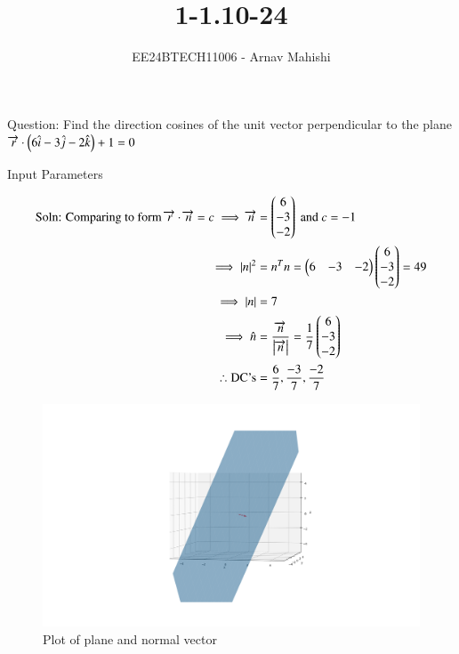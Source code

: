 \documentclass[journal]{IEEEtran}
\begin{document}

\vspace{3cm}

\title{1-1.10-24}
\author{EE24BTECH11006 - Arnav Mahishi}
{\let\newpage\relax\maketitle}

\renewcommand{\thefigure}{\theenumi}
\renewcommand{\thetable}{\theenumi}
\setlength{\intextsep}{10pt} %


\renewcommand{\thetable}{\theenumi}
Question: Find the direction cosines of the unit vector perpendicular to the plane\\ $\overrightarrow{r}\cdot\left(6\hat{i}-3\hat{j}-2\hat{k}\right)+1=0$\\
\begin{table}[h!]    
  \centering
  
  \caption{Input Parameters}
\end{table}
\begin{align}
    \text{Soln: Comparing to form $\overrightarrow{r}\cdot\overrightarrow{n}=c$}\implies\overrightarrow{n}&=\begin{pmatrix}6\\-3\\-2\end{pmatrix} \text{ and } c=-1\\
    \implies\left\vert n\right\vert^2&=n^Tn=\begin{pmatrix}6&-3&-2\end{pmatrix}\begin{pmatrix}6\\-3\\-2\end{pmatrix}=49\\
    \implies\left\vert n\right\vert&=7\\
    \implies\hat{n}&=\frac{\overrightarrow{n}}{\left\vert\overrightarrow{n}\right\vert}=\frac{1}{7}\begin{pmatrix}6\\-3\\-2\end{pmatrix}\\
    \therefore\text{DC's}&=\frac{6}{7},\frac{-3}{7},\frac{-2}{7}
\end{align}
\begin{figure}[h!]
   \centering
   \includegraphics[width=0.7\linewidth]{figs/Figure_1.png}
   \caption{Plot of plane and normal vector}
   \label{stemplot}
\end{figure}
\end{document}
